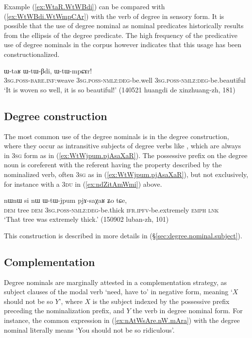 Example (\ref{ex:WtaR.WtWBdi}) can be compared with (\ref{ex:WtWBdi.WtWmpCAr}) with the verb of degree  in sensory form. It is possible that the use of degree nominal as nominal predicates historically results from the ellipsis of the degree predicate. The high frequency of the predicative use of degree nominals in the corpus however indicates that this usage has been constructionalized.

\begin{exe}
\ex \label{ex:WtWBdi.WtWmpCAr}
\gll ɯ-taʁ ɯ-tɯ-βdi, ɯ-tɯ-mpɕɤr! \\
\textsc{3sg}.\textsc{poss}-\textsc{bare}.\textsc{inf}:weave  \textsc{3sg}.\textsc{poss}-\textsc{nmlz}:\textsc{deg}-be.well \textsc{3sg}.\textsc{poss}-\textsc{nmlz}:\textsc{deg}-be.beautiful  \\
\glt `It is woven so well, it is so beautiful!' (140521 huangdi de xinzhuang-zh, 181)
\end{exe}

\subsection{Degree construction} \label{sec:degree.nominal.construction}
The most common use of the degree nominals is in the degree construction, where they occur as intransitive subjects of degree verbs like , which are always in \textsc{3sg} form as in (\ref{ex:WtWjpum.pjAsaXaR}). The possessive prefix on the degree noun is coreferent with the referent having the property described by the nominalized verb, often \textsc{3sg} as in  (\ref{ex:WtWjpum.pjAsaXaR}), but not exclusively, for instance with a \textsc{3du} in (\ref{ex:ndZitAmWmi}) above.


\begin{exe}
\ex \label{ex:WtWjpum.pjAsaXaR}
\gll nɯnɯ si nɯ ɯ-tɯ-jpum pjɤ-saχaʁ ʑo tɕe,\\
\textsc{dem} tree \textsc{dem} \textsc{3sg}.\textsc{poss}-\textsc{nmlz}:\textsc{deg}-be.thick \textsc{ifr}.\textsc{ipfv}-be.extremely \textsc{emph} \textsc{lnk} \\
\glt `That tree was extremely thick.' (150902 luban-zh, 101)
\end{exe}

This construction is described in more details in (§\ref{sec:degree.nominal.subject}).



\subsection{Complementation} \label{sec:degree.nominal.complement}
Degree nominals are marginally attested in a complementation strategy, as subject clauses of the modal verb  `need, have to' in negative form, meaning `$X$ should not be so $Y$', where $X$ is the subject indexed by the possessive prefix preceding the  nominalization prefix, and $Y$ the verb in degree nominal form. For instance, the common expression in (\ref{ex:nAtWsAre.nW.mAra}) with the degree nominal  literally means `You should not be so ridiculous'.  

